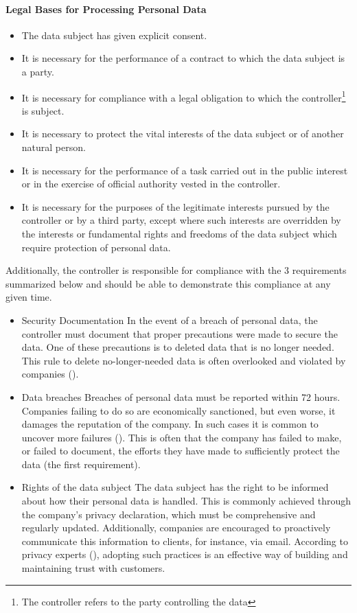 \paragraph{Legal Bases for Processing Personal Data}
\label{sec:legal-bases-processing-personal-data}
\begin{itemize}
    \item The data subject has given explicit consent.
    \item It is necessary for the performance of a contract to which the data subject is a party.
    \item It is necessary for compliance with a legal obligation to which the controller\footnote{The controller refers to the party controlling the data} is subject.
    \item It is necessary to protect the vital interests of the data subject or of another natural person.
    \item It is necessary for the performance of a task carried out in the public interest or in the exercise of official authority vested in the controller.
    \item It is necessary for the purposes of the legitimate interests pursued by the controller or by a third party, except where such interests are overridden by the interests or fundamental rights and freedoms of the data subject which require protection of personal data.
\end{itemize}

Additionally, the controller is responsible for compliance with the 3 requirements summarized below and should be able to demonstrate this compliance at any given time.

\begin{itemize}
    \item{Security Documentation}
    In the event of a breach of personal data, the controller must document that proper precautions were made to secure the data. One of these precautions is to deleted data that is no longer needed. This rule to delete no-longer-needed data is often overlooked and violated by companies (\cite{sa2022webinar_gdpr}).
    \item{Data breaches}
    Breaches of personal data must be reported within 72 hours. Companies failing to do so are economically sanctioned, but even worse, it damages the reputation of the company. In such cases it is common to uncover more failures (\cite{sa2022webinar_gdpr}). This is often that the company has failed to make, or failed to document, the efforts they have made to sufficiently protect the data (the first requirement).
    \item{Rights of the data subject}
    The data subject has the right to be informed about how their personal data is handled. This is commonly achieved through the company's privacy declaration, which must be comprehensive and regularly updated. Additionally, companies are encouraged to proactively communicate this information to clients, for instance, via email. According to privacy experts (\cite{sa2022webinar_gdpr}), adopting such practices is an effective way of building and maintaining trust with customers.
\end{itemize}
    
